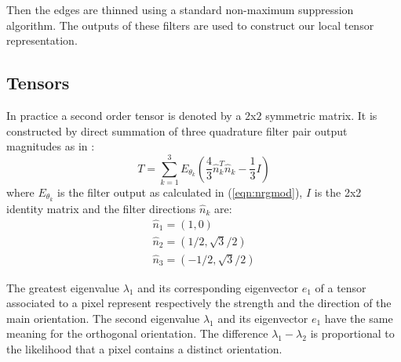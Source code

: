 \documentclass{llncs}
\begin{document}
Then the edges are thinned using a standard non-maximum
suppression algorithm.
The outputs of these filters are used to construct our local tensor
representation.



\subsection{Tensors}


In practice a second order tensor is denoted by a $2$x$2$ symmetric matrix.
It is constructed by direct summation of three quadrature filter pair output magnitudes as in \cite{Knutsson89}:
\begin{equation} \label{eqn:sumquad}
T=\sum^3_{k=1}E_{\theta_k}\left(\frac{4}{3}\hat{n}_k^T \hat{n}_k-\frac{1}{3}I\right)
\end{equation}
where $E_{\theta_k}$ is the filter output as calculated in (\ref{eqn:nrgmod}), $I$ is the 2x2 identity matrix and the filter directions $\hat{n}_k$ are:
\begin{equation} \label{eqn:fildir}
\begin{array}{lll}
\hat{n}_1=\left(1,0\right) \\
\hat{n}_2=\left(1/2,\sqrt{3}/2\right) \\
\hat{n}_3=\left(-1/2,\sqrt{3}/2\right)
\end{array}
\end{equation}

The greatest eigenvalue $\lambda_1$ and its corresponding eigenvector $e_1$ of a tensor associated to a pixel represent respectively the strength and the direction of the main orientation. The second eigenvalue $\lambda_1$ and its eigenvector $e_1$ have the same meaning for the orthogonal orientation. The difference $\lambda_1-\lambda_2$ is proportional to the likelihood that a pixel contains a distinct orientation.
\end{document}
